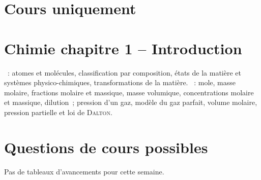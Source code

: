 \documentclass[a4paper, 12pt, final, garamond]{book}
\begin{document}
\section{Cours uniquement}
\section*{Chimie chapitre 1 -- Introduction}
\begin{enumerate}[label=\Roman*]
	~: atomes et molécules, classification par
	composition, états de la matière et systèmes physico-chimiques,
	transformations de la matière.
	~: mole, masse molaire, fractions
	molaire et massique, masse volumique, concentrations molaire et
	massique, dilution~; pression d'un gaz, modèle du gaz parfait, volume
	molaire, pression partielle et loi de \textsc{Dalton}.
\end{enumerate}

\section{Questions de cours possibles}
\begin{center}
	\begin{framed}
		\Large
		Pas de tableaux d'avancements pour cette semaine.
	\end{framed}
\end{center}

\newpage
\end{document}
